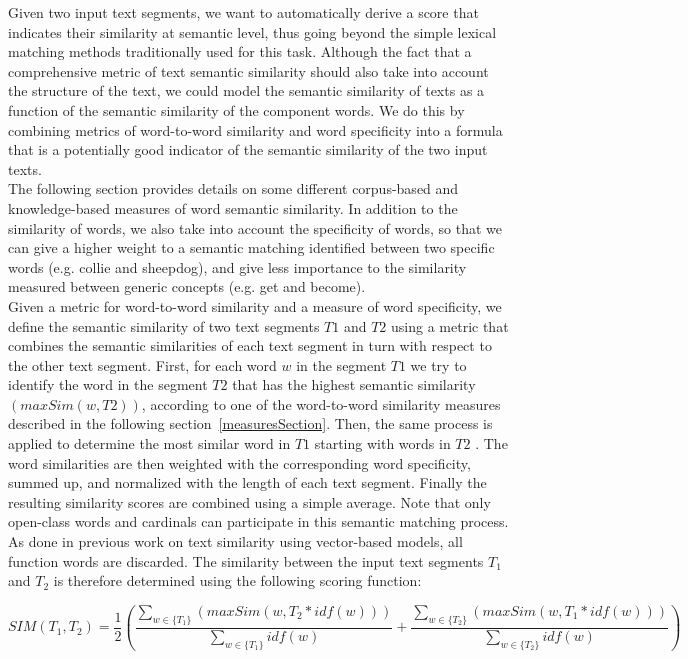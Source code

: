 Given two input text segments, we want to automatically derive a score that indicates their similarity at semantic level, thus going beyond the simple lexical matching methods traditionally used for this task. Although the fact that a comprehensive metric of text semantic similarity  should also take into account the structure of the text, we could model the semantic similarity of texts as a function of the semantic similarity of the component words. We do this by combining metrics of word-to-word similarity and word specificity into a formula that is a potentially good indicator of the semantic similarity of the two input texts.\\
   The following section provides details on some different corpus-based and knowledge-based measures of word semantic similarity. In addition to the similarity of words, we also take into account the specificity of words, so that we can give a higher weight to a semantic matching identified between two specific words (e.g. collie and sheepdog), and give less importance to the similarity measured between generic concepts 
(e.g. get and become).\\
Given a metric for word-to-word similarity and a measure of word specificity, we define the semantic similarity of two text segments $T1$ and $T2$ using a metric that combines the semantic similarities of each text segment in turn with respect to the other text segment. First, for each word $w$ in the segment $T1$ we try to identify the word in the segment $T2$ that has the highest semantic similarity $(maxSim(w, T2 ))$, according to one of the word-to-word similarity measures described in the following section~\ref{measuresSection}. Then, the same process is applied to determine the most similar word in $T1$ starting with words in $T2$ . The word similarities are then weighted with the corresponding word specificity, summed up, and normalized with the length of each text segment. Finally the resulting similarity scores are combined using a simple average. Note that only open-class words and cardinals can participate in this semantic matching process. As done in previous work on text similarity using vector-based models, all function words are discarded.
The similarity between the input text segments $T_1$ and $T_2$ is therefore determined using the following scoring function:
    
\begin{equation}
\label{simEq}
SIM({T_{1}},{T_{2}}) =\frac{1}{2}(\frac{\sum_{w\in \{T_1\}} (maxSim(w,T_2 * idf(w)))}{\sum_{w\in \{T_1\}} idf(w)} + \frac{\sum_{w\in \{T_2\}} (maxSim(w,T_1 * idf(w)))}{\sum_{w\in \{T_2\}} idf(w)})
\end{equation}

